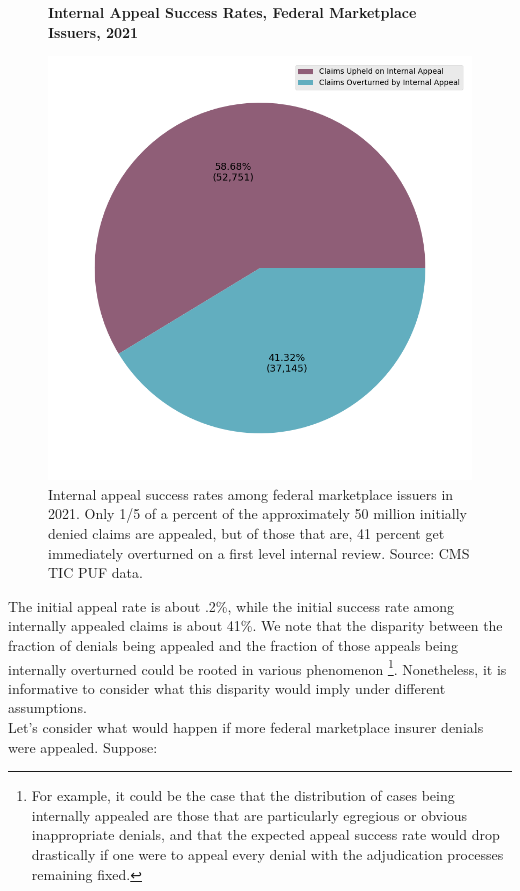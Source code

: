 \documentclass[psamsfonts]{amsart}
\theoremstyle{plain}
\theoremstyle{definition}
\theoremstyle{remark}
\begin{document}
\begin{figure}
	\centering
	\textbf{Internal Appeal Success Rates, Federal Marketplace Issuers, 2021}\par\medskip
\includegraphics[width=0.85\columnwidth]{images/cms_puf/internal_appeal_success_rates_all_insurers.png}
	\caption{ Internal appeal success rates among federal marketplace issuers in 2021. Only 1/5 of a percent of the approximately 50 million initially denied claims are appealed, but of those that are, 41 percent get immediately overturned on a first level internal review. Source: CMS TIC PUF data.}
	\label{federal_internal_appeal_success_rates}
\end{figure}


The initial appeal rate is about .2\%, while the initial success rate among internally appealed claims is about 41\%. We note that the disparity between the fraction of denials being appealed and the fraction of those appeals being internally overturned could be rooted in various phenomenon \footnote{For example, it could be the case that the distribution of cases being internally appealed are those that are particularly egregious or obvious inappropriate denials, and that the expected appeal success rate would drop drastically if one were to appeal every denial with the adjudication processes remaining fixed.}. Nonetheless, it is informative to consider what this disparity would imply under different assumptions. \\

Let's consider what would happen if more federal marketplace insurer denials were appealed. Suppose:
\end{document}
